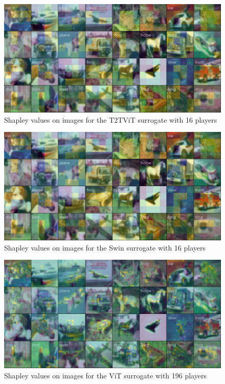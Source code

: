 \documentclass[en]{pracamgr}
\begin{document}
\begin{figure}[H]
\centering
\includegraphics[scale=0.4]{./images/t2t_vit_shap_grid.png}
\caption{Shapley values on images for the T2T\textunderscore{}ViT surrogate with 16 players}
\label{t2t_vit_shap_grid}
\end{figure}


\begin{figure}[H]
\centering
\includegraphics[scale=0.4]{./images/swin_shap_grid.png}
\caption{Shapley values on images for the Swin surrogate with 16 players}
\label{swin_shap_grid}
\end{figure}

\pagebreak




\begin{figure}[H]
\centering
\includegraphics[scale=0.4]{./images/vit_shap_grid_196.png}
\caption{Shapley values on images for the ViT surrogate with 196 players}
\label{vit_shap_grid_196}
\end{figure}
\end{document}
